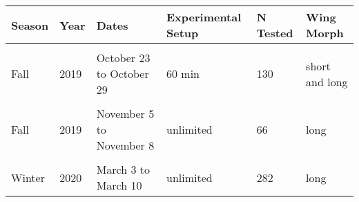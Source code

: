 \begin{table}[H]
\centering\begin{table}[H]
\centering
\begin{tabular}{l|l|l|l|l|l}
\hline
Season & Year & Dates & Experimental Setup & N Tested & Wing Morph\\
\hline
\cellcolor[HTML]{f5f5f5}{Fall} & \cellcolor[HTML]{f5f5f5}{2019} & \cellcolor[HTML]{f5f5f5}{October 15 to October 23} & \cellcolor[HTML]{f5f5f5}{30 min} & \cellcolor[HTML]{f5f5f5}{182} & \cellcolor[HTML]{f5f5f5}{short and long}\\
\hline
Fall & 2019 & October 23 to October 29 & 60 min & 130 & short and long\\
\hline
\cellcolor[HTML]{f5f5f5}{Fall} & \cellcolor[HTML]{f5f5f5}{2019} & \cellcolor[HTML]{f5f5f5}{October 30 to November 4} & \cellcolor[HTML]{f5f5f5}{90 min} & \cellcolor[HTML]{f5f5f5}{126} & \cellcolor[HTML]{f5f5f5}{short and long}\\
\hline
Fall & 2019 & November 5 to November 8 & unlimited & 66 & long\\
\hline
\cellcolor[HTML]{f5f5f5}{Winter} & \cellcolor[HTML]{f5f5f5}{2020} & \cellcolor[HTML]{f5f5f5}{February 17 to February 28} & \cellcolor[HTML]{f5f5f5}{unlimited} & \cellcolor[HTML]{f5f5f5}{332} & \cellcolor[HTML]{f5f5f5}{long}\\
\hline
Winter & 2020 & March 3 to March 10 & unlimited & 282 & long\\
\hline
\end{tabular}
\end{table}
\end{table}
